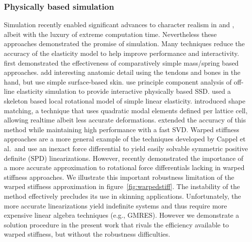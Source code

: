 		\subsubsection{Physically based simulation}		
Simulation recently enabled significant advances to character realism in \cite{Irving:2008:SDF} and \cite{clutterbuck:2010:avatar}, albeit with the luxury of extreme computation time. Nevertheless these approaches demonstrated the promise of simulation. Many techniques reduce the accuracy of the elasticity model to help improve performance and interactivity. \cite{Waters90,Chadwick89} first demonstrated the effectiveness of comparatively simple mass/spring based approaches. \cite{Sueda:2008} add interesting anatomic detail using the tendons and bones in the hand, but use simple surface-based skin. \cite{Kry02} use principle component analysis of off-line elasticity simulation to provide interactive physically based SSD. \cite{capell:2005:pb,Capell:2002:ISD:566570.566622,Galopo07} used a skeleton based local rotational model of simple linear elasticity. \cite{Muller:2005:MDB} introduced shape matching, a technique that uses quadratic modal elements defined per lattice cell, allowing realtime albeit less accurate deformations. \cite{Rivers:2007:FFL} extended the accuracy of this
method while maintaining high performance with a fast SVD. Warped stiffness approaches \cite{Muller:2002:SRD,Muller:2004:IVM} are a more general example of the techniques developed by Cappel et al.\ and use an inexact force differential to yield easily solvable symmetric positive definite (SPD) linearizations. However, \cite{Chao:2010:SGM} recently demonstrated the importance of a more accurate approximation to rotational force differentials lacking in warped stiffness approaches. We  illustrate this important robustness limitation of the warped stiffness approximation in figure~\ref{fig:warpedstiff}. The instability of the method effectively precludes its use in skinning applications. Unfortunately, the more accurate linearizations  yield indefinite systems and thus require more expensive linear algebra techniques (e.g., GMRES). However we demonstrate a solution procedure in the present work that rivals the efficiency available to warped stiffness, but without the robustness difficulties.

